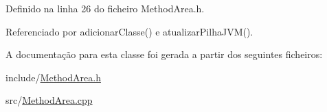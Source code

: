 Definido na linha 26 do ficheiro Method\+Area.\+h.



Referenciado por adicionar\+Classe() e atualizar\+Pilha\+J\+V\+M().



A documentação para esta classe foi gerada a partir dos seguintes ficheiros\+:\begin{DoxyCompactItemize}
\item 
include/\hyperlink{MethodArea_8h}{Method\+Area.\+h}\item 
src/\hyperlink{MethodArea_8cpp}{Method\+Area.\+cpp}\end{DoxyCompactItemize}
